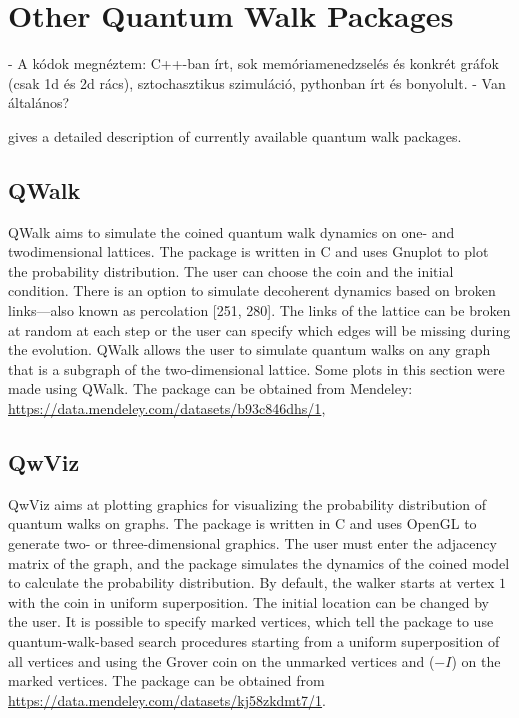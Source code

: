 \chapter{Other Quantum Walk Packages}

- A kódok megnéztem: C++-ban írt, sok memóriamenedzselés és konkrét gráfok (csak 1d és 2d rács), sztochasztikus szimuláció, pythonban írt és bonyolult.
- Van általános?


\cite{Portugal} gives a detailed description of currently available quantum walk packages.

\section{QWalk}

QWalk aims to simulate the coined quantum walk dynamics on one- and twodimensional lattices. The package is written in C and uses Gnuplot to plot the probability distribution. The user can choose the coin and the initial condition. There is an option to simulate decoherent dynamics based on broken links—also known as percolation [251, 280]. The links of the lattice can be broken at random at each step or the user can specify which edges will be missing during the evolution. QWalk allows the user to simulate quantum walks on any graph that is a subgraph of the two-dimensional lattice. Some plots in this section were made using QWalk. The package can be obtained from Mendeley: \url{https://data.mendeley.com/datasets/b93c846dhs/1}, 


\section{QwViz}

QwViz aims at plotting graphics for visualizing the probability distribution of quantum walks on graphs. The package is written in C and uses OpenGL to generate two- or three-dimensional graphics. The user must enter the adjacency matrix of the graph, and the package simulates the dynamics of the coined model to calculate the probability distribution. By default, the walker starts at vertex $1$ with the coin in uniform superposition. The initial location can be changed by the user. It is possible to specify marked vertices, which tell the package to use quantum-walk-based search procedures starting from a uniform superposition of all vertices and using the Grover coin on the unmarked vertices and ($-I$) on the marked vertices. The package can be obtained from \url{https://data.mendeley.com/datasets/kj58zkdmt7/1}.

